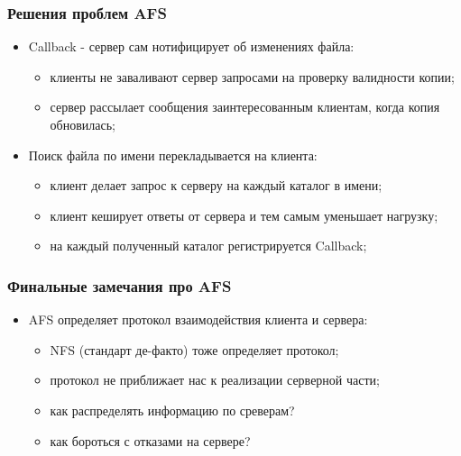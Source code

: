 \begin{frame}
\frametitle{Решения проблем AFS}
\begin{itemize}
  \item<1-> Callback - сервер сам нотифицирует об изменениях файла:
    \begin{itemize}
      \item клиенты не заваливают сервер запросами на проверку валидности копии;
      \item сервер рассылает сообщения заинтересованным клиентам, когда копия обновилась;
    \end{itemize}
  \item<2-> Поиск файла по имени перекладывается на клиента:
    \begin{itemize}
      \item клиент делает запрос к серверу на каждый каталог в имени;
      \item клиент кеширует ответы от сервера и тем самым уменьшает нагрузку;
      \item на каждый полученный каталог регистрируется Callback;
    \end{itemize}
\end{itemize}
\end{frame}

\begin{frame}
\frametitle{Финальные замечания про AFS}
\begin{itemize}
  \item AFS определяет протокол взаимодействия клиента и сервера:
    \begin{itemize}
      \item NFS (стандарт де-факто) тоже определяет протокол;
      \item протокол не приближает нас к реализации серверной части;
      \item как распределять информацию по среверам?
      \item как бороться с отказами на сервере?
    \end{itemize}
\end{itemize}
\end{frame}
